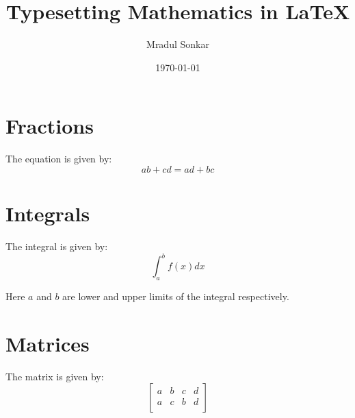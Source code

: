 \documentclass{article}
\title{Typesetting Mathematics in LaTeX}
\author{Mradul Sonkar}
\date{\today}
\begin{document}
\maketitle

\section*{Fractions}
The equation is given by:
\begin{equation*}
    ab + cd = ad + bc
\end{equation*}

\section*{Integrals}
The integral is given by:
\[
    \int_{a}^{b} f(x) dx
\]

Here $a$ and $b$ are lower and upper limits of the integral respectively.

\section*{Matrices}
The matrix is given by:
\[
    \begin{bmatrix}
        a & b & c & d \\
        a & c & b & d \\
    \end{bmatrix}
\]
\end{document}
